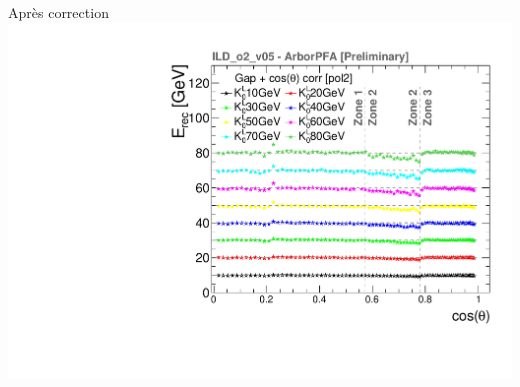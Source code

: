 \documentclass[8pt]{beamer}
\begin{document}
\begin{frame}
\begin{minipage}{0.46\linewidth}
\begin{center}
        Après correction \\ \includegraphics[width=0.75\linewidth]{ERecCorrThetaGapO2_thesis.pdf}
      \end{center}
    \end{minipage}
  \end{frame}
\end{document}
